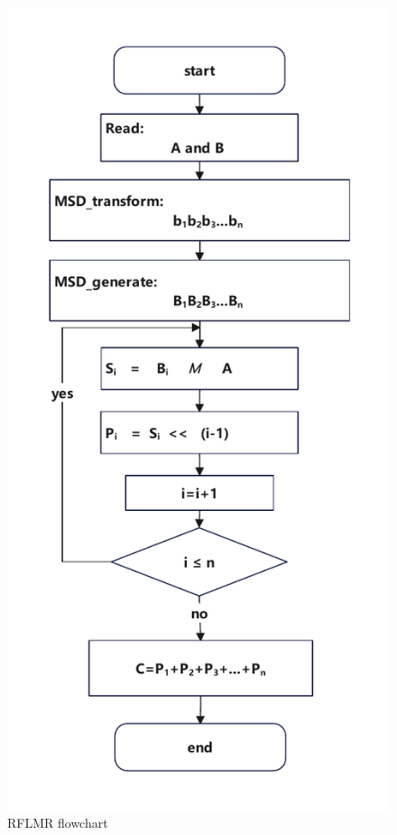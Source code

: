 \documentclass[electronics,article,accept,pdftex,moreauthors]{Definitions/mdpi}
\begin{document}
\begin{figure}[H]
    \includegraphics[scale=0.55]{./images/8.pdf}
    \caption{RFLMR flowchart}
    \label{fig9}
\end{figure}
\end{document}
